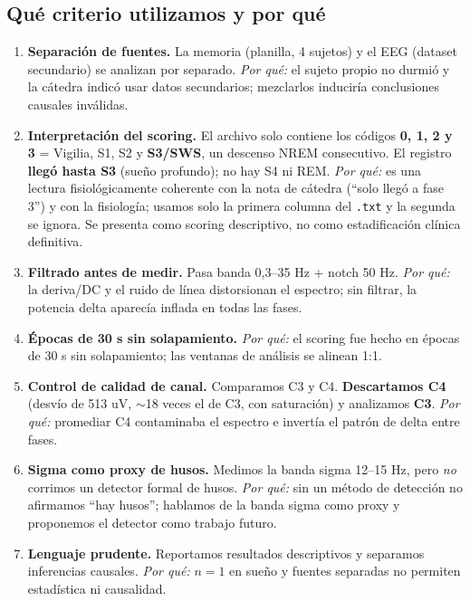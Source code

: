 \documentclass[11pt,a4paper]{article}
\begin{document}
\subsection{Qué criterio utilizamos y por qué}
\begin{enumerate}
  \item \textbf{Separación de fuentes.} La memoria (planilla, 4 sujetos) y el EEG (dataset
        secundario) se analizan por separado. \emph{Por qué:} el sujeto propio no durmió y
        la cátedra indicó usar datos secundarios; mezclarlos induciría conclusiones
        causales inválidas.
  \item \textbf{Interpretación del scoring.} El archivo solo contiene los códigos
        \textbf{0, 1, 2 y 3} = Vigilia, S1, S2 y \textbf{S3/SWS}, un descenso NREM
        consecutivo. El registro \textbf{llegó hasta S3} (sueño profundo); no hay S4 ni
        REM. \emph{Por qué:} es una lectura fisiológicamente coherente con la nota de cátedra
        (``solo llegó a fase 3'') y con la fisiología; usamos solo la primera columna del
        \texttt{.txt} y la segunda se ignora. Se presenta como scoring descriptivo, no como
        estadificación clínica definitiva.
  \item \textbf{Filtrado antes de medir.} Pasa banda 0,3--35 Hz + notch 50 Hz. \emph{Por
        qué:} la deriva/DC y el ruido de línea distorsionan el espectro; sin filtrar, la
        potencia delta aparecía inflada en todas las fases.
  \item \textbf{Épocas de 30 s sin solapamiento.} \emph{Por qué:} el scoring fue hecho en
        épocas de 30 s sin solapamiento; las ventanas de análisis se alinean 1:1.
  \item \textbf{Control de calidad de canal.} Comparamos C3 y C4. \textbf{Descartamos C4}
        (desvío de 513 uV, $\sim$18 veces el de C3, con saturación) y analizamos
        \textbf{C3}. \emph{Por qué:} promediar C4 contaminaba el espectro e invertía el
        patrón de delta entre fases.
  \item \textbf{Sigma como proxy de husos.} Medimos la banda sigma 12--15 Hz, pero
        \emph{no} corrimos un detector formal de husos. \emph{Por qué:} sin un método de
        detección no afirmamos ``hay husos''; hablamos de la banda sigma como proxy y
        proponemos el detector como trabajo futuro.
  \item \textbf{Lenguaje prudente.} Reportamos resultados descriptivos y separamos
        inferencias causales. \emph{Por qué:} $n=1$ en sueño y fuentes separadas no
        permiten estadística ni causalidad.
\end{enumerate}
\end{document}
